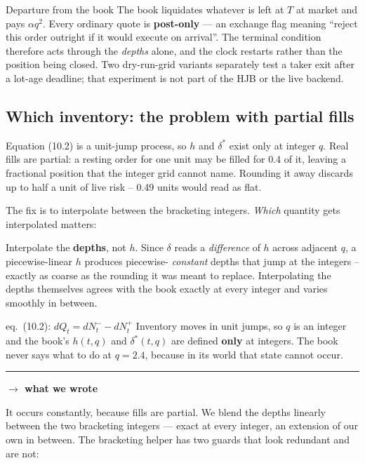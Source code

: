 \documentclass[11pt,a4paper]{article}
\newcommand{\wecode}{\par\vspace{4pt}\noindent
  \textcolor{NavyLink}{\rule{\linewidth}{0.4pt}}\par\vspace{3pt}
  \noindent\textbf{\textcolor{NavyLink}{$\rightarrow$ what we wrote}}\par\vspace{2pt}}
\begin{document}
\begin{departure}{Departure from the book}
The book liquidates whatever is left at $T$ at market and pays $\alpha q^{2}$.
Every ordinary quote is \textbf{post-only} --- an exchange flag meaning ``reject
this order outright if it would execute on arrival''. The terminal condition
therefore acts through the \emph{depths} alone, and the clock restarts rather
than the position being closed. Two dry-run-grid variants separately test a
taker exit after a lot-age deadline; that experiment is not part of the HJB or
the live backend.
\end{departure}

\subsection{Which inventory: the problem with partial fills}

Equation (10.2) is a unit-jump process, so $h$ and $\delta^{*}$ exist only at
integer $q$. Real fills are partial: a resting order for one unit may be filled
for 0.4 of it, leaving a fractional position that the integer grid cannot name.
Rounding it away discards up to half a unit of live risk -- 0.49 units would read
as flat.

The fix is to interpolate between the bracketing integers. \emph{Which} quantity
gets interpolated matters:

\begin{intuition}
Interpolate the \textbf{depths}, not $h$. Since $\delta$ reads a \emph{difference}
of $h$ across adjacent $q$, a piecewise-linear $h$ produces piecewise-%
\emph{constant} depths that jump at the integers -- exactly as coarse as the
rounding it was meant to replace. Interpolating the depths themselves agrees
with the book exactly at every integer and varies smoothly in between.
\end{intuition}

\begin{booktocode}{eq.~(10.2): $dQ_t = dN^{-}_t - dN^{+}_t$}
Inventory moves in unit jumps, so $q$ is an integer and the book's $h(t,q)$ and
$\delta^{*}(t,q)$ are defined \textbf{only} at integers. The book never says what
to do at $q = 2.4$, because in its world that state cannot occur.
\wecode
It occurs constantly, because fills are partial. We blend the depths linearly
between the two bracketing integers --- exact at every integer, an extension of
our own in between. The bracketing helper has two guards that look redundant and
are not:
\end{booktocode}
\end{document}
